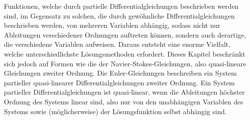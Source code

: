 Funktionen, welche durch partielle Differentialgleichungen beschrieben werden sind, im Gegensatz zu solchen, die durch gewöhnliche Differentialgleichungen beschrieben werden, von mehreren Variablen abhängig, sodass nicht nur Ableitungen verschiedener Ordnungen auftreten können, sondern auch derartige, die verschiedene Variablen aufweisen. Daraus entsteht eine enorme Vielfalt, welche unterschiedlichste Lösungsmethoden erfordert. Dieses Kapitel beschränkt sich jedoch auf Formen wie die der Navier-Stokes-Gleichungen, also quasi-lineare Gleichungen zweiter Ordnung.
Die Euler-Gleichungen beschreiben ein System partieller quasi-linearer Differentialgleichungen zweiter Ordnung. Ein System partieller Differentialgleichungen ist quasi-linear, wenn die Ableitungen höchster Ordnung des Systems linear sind, also nur von den unabhängigen Variablen des Systems sowie (möglicherweise) der Lösungsfunktion selbst abhängig sind. 
